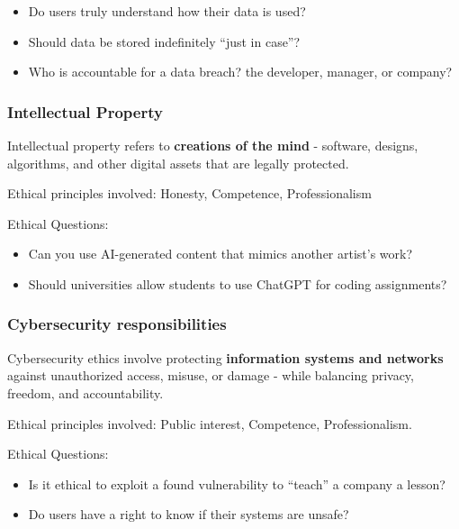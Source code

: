 \begin{itemize}
    \item Do users truly understand how their data is used?
    \item Should data be stored indefinitely “just in case”?
    \item Who is accountable for a data breach? the developer, manager, or company?
\end{itemize}

\subsubsection{Intellectual Property}

\indent

Intellectual property refers to \textbf{creations of the mind} - software, designs, algorithms, and other digital assets that are legally protected.

Ethical principles involved: Honesty, Competence, Professionalism

Ethical Questions:

\begin{itemize}
    \item Can you use AI-generated content that mimics another artist’s work?
    \item Should universities allow students to use ChatGPT for coding assignments?
\end{itemize}

\subsubsection{Cybersecurity responsibilities}

\indent

Cybersecurity ethics involve protecting \textbf{information systems and networks} against unauthorized access, misuse, or damage - while balancing privacy, freedom, and accountability.

Ethical principles involved: Public interest, Competence, Professionalism.

Ethical Questions:

\begin{itemize}
    \item Is it ethical to exploit a found vulnerability to “teach” a company a lesson?
    \item Do users have a right to know if their systems are unsafe?
\end{itemize}

